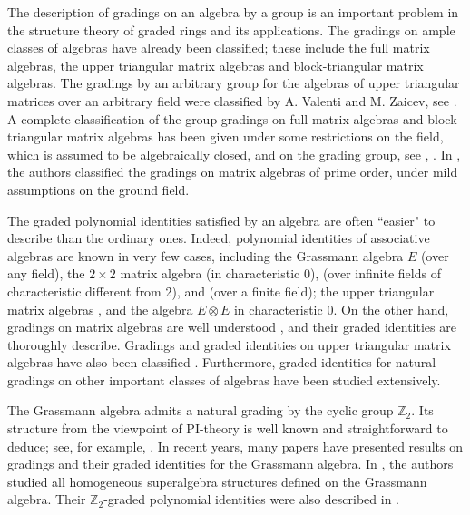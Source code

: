 \documentclass{article}
\begin{document}
	The description of gradings on an algebra by a group is an important problem in the structure theory of graded rings and its applications. The gradings on ample classes of algebras have already been classified; these include the full matrix algebras, the upper triangular matrix algebras and block-triangular matrix algebras. The gradings by an arbitrary group for the algebras of upper triangular matrices over an arbitrary field were classified by A. Valenti and M. Zaicev, see \cite{VZ}. A complete classification of the group gradings on full matrix algebras and block-triangular matrix algebras has been given under some restrictions on the field, which is assumed to be algebraically closed, and on the grading group, see \cite{BZ}, \cite{DGK}. In \cite{AGDD}, the authors classified the gradings on matrix algebras of prime order, under mild assumptions on the ground field.
	
	
	
	
	
	The graded polynomial identities satisfied by an algebra are often ``easier" to describe than the ordinary ones. Indeed, polynomial identities of associative algebras are known in very few cases, including the Grassmann algebra $E$ (over any field), the $2 \times 2$ matrix algebra \cite{second-order D, Yu Raz} (in characteristic 0), \cite{plamen order 2} (over infinite fields of characteristic different from 
	2), and \cite{malcev kuzmin} (over a finite field); the upper triangular matrix algebras \cite{malcev only, chiripov}, and the algebra $E\otimes E$ \cite{popov} in 
	characteristic 0. On the other hand, gradings on matrix algebras are well understood \cite{Bah}, and their graded identities are thoroughly describe. Gradings and graded identities on upper triangular matrix algebras have also been classified \cite{VPV, VZ}. Furthermore, graded identities for natural gradings on other important classes of algebras have been studied extensively.
	
	The Grassmann algebra admits a natural grading by the cyclic group $\mathbb{Z}_2$. Its structure from the viewpoint of PI-theory is well known and straightforward to deduce; see, for example, \cite{GMZ}. In recent years, many papers have presented results on gradings and their graded identities for the Grassmann algebra. In \cite{disil}, the authors studied all homogeneous superalgebra structures defined on the Grassmann algebra. Their $\mathbb{Z}_2$-graded polynomial identities were also described in \cite{disil, centroneP, LFG}.
	
\end{document}
